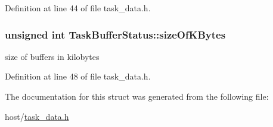 Definition at line 44 of file task\_\-data.h.\hypertarget{structTaskBufferStatus_ac09e520b4c35bddd83c61ab0a0d20e94}{
\subsubsection[{sizeOfKBytes}]{\setlength{\rightskip}{0pt plus 5cm}unsigned int {\bf TaskBufferStatus::sizeOfKBytes}}}
\label{structTaskBufferStatus_ac09e520b4c35bddd83c61ab0a0d20e94}


size of buffers in kilobytes 

Definition at line 48 of file task\_\-data.h.

The documentation for this struct was generated from the following file:\begin{DoxyCompactItemize}
\item 
host/\hyperlink{task__data_8h}{task\_\-data.h}\end{DoxyCompactItemize}
